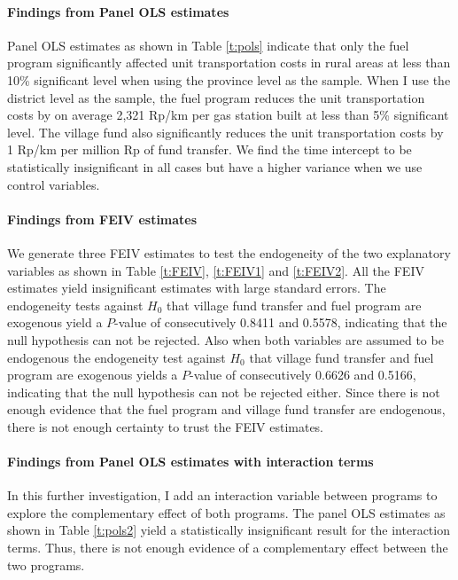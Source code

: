 \documentclass[letterpaper,12pt,leqno]{article}
\begin{document}
\paragraph{Findings from Panel OLS estimates} Panel OLS estimates as shown in Table \ref{t:pols} indicate that only the fuel program significantly affected unit transportation costs in rural areas at less than 10\% significant level when using the province level as the sample. When I use the district level as the sample, the fuel program reduces the unit transportation costs by on average 2,321 Rp/km per gas station built at less than 5\% significant level. The village fund also significantly reduces the unit transportation costs by 1 Rp/km per million Rp of fund transfer. We find the time intercept to be statistically insignificant in all cases but have a higher variance when we use control variables.
        
\paragraph{Findings from FEIV estimates} We generate three FEIV estimates to test the endogeneity of the two explanatory variables as shown in Table \ref{t:FEIV}, \ref{t:FEIV1} and \ref{t:FEIV2}. All the FEIV estimates yield insignificant estimates with large standard errors. The endogeneity tests against $H_0$ that village fund transfer and fuel program are exogenous yield a $P$-value of consecutively 0.8411 and 0.5578, indicating that the null hypothesis can not be rejected. Also when both variables are assumed to be endogenous the endogeneity test against $H_0$ that village fund transfer and fuel program are exogenous yields a $P$-value of consecutively 0.6626 and 0.5166, indicating that the null hypothesis can not be rejected either. Since there is not enough evidence that the fuel program and village fund transfer are endogenous, there is not enough certainty to trust the FEIV estimates.

\paragraph{Findings from Panel OLS estimates with interaction terms} In this further investigation, I add an interaction variable between programs to explore the complementary effect of both programs. The panel OLS estimates as shown in Table \ref{t:pols2} yield a statistically insignificant result for the interaction terms. Thus, there is not enough evidence of a complementary effect between the two programs.
\end{document}
